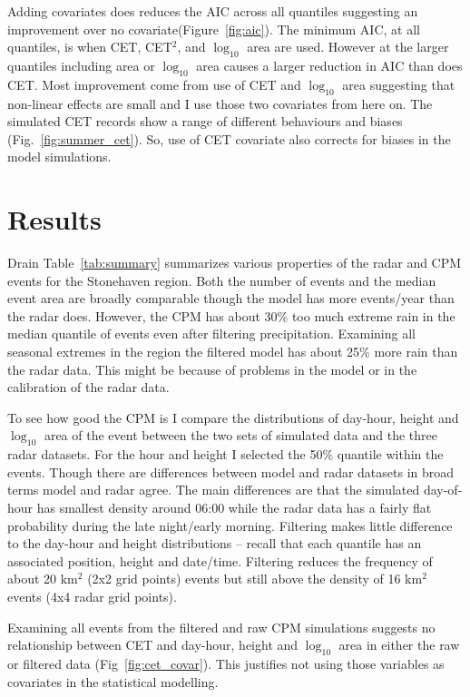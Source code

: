 \documentclass[11pt,a4paper]{article}
\begin{document}
Adding covariates does reduces the AIC across all quantiles suggesting an improvement over no covariate(Figure~\ref{fig:aic}). The minimum AIC, at all quantiles, is when CET, CET$^2$,  and $\log_{10}$ area are used. However at the larger quantiles including area or $\log_{10}$ area causes a larger reduction in AIC than does CET.  Most improvement come from use of CET and $\log_{10}$ area suggesting that non-linear effects are small and I use those two covariates from here on. 
The simulated CET records show a range of different behaviours and biases (Fig.~\ref{fig:summer_cet}). So, use of CET covariate also corrects for biases in the model simulations. 


\section{Results}
Drain
Table~\ref{tab:summary} summarizes various properties of the radar and CPM events for the Stonehaven region.  Both the number of events and the median event area are broadly comparable though the model has more events/year than the radar does.  However, the CPM has about 30\% too much extreme rain in the median quantile of events even after filtering precipitation. Examining  all seasonal extremes in the region the filtered model has about 25\% more rain than the radar data.  This might be because of problems in the model or in the calibration of the radar data. 

To see how good the CPM is I compare the distributions of  day-hour, height and  $\log_{10}$ area of the event between the two sets of simulated data and the three radar datasets. For the hour and height I selected the 50\% quantile within the events. Though there are differences between model and radar datasets in broad terms model and radar agree. The main differences are that the simulated day-of-hour has smallest density around 06:00 while the radar data has a fairly flat probability during the late night/early morning. Filtering makes little difference to the day-hour and height distributions -- recall that each quantile has an associated position, height and date/time. Filtering reduces the frequency of about 20 km$^2$ (2x2 grid points) events but still above the density of 16 km$^2$ events (4x4 radar grid points). 

Examining all events from the filtered and raw CPM simulations suggests no relationship between CET and day-hour, height and $\log_{10}$ area in either the raw or filtered data (Fig~\ref{fig:cet_covar}). This justifies not using those variables as covariates in the statistical modelling. 
\end{document}
